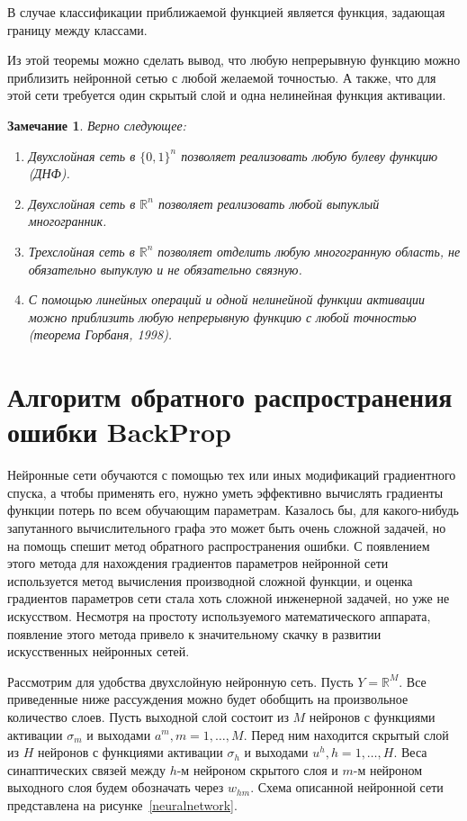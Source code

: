 \documentclass{article}
\newtheorem{remark}{Замечание}
\begin{document}
	В случае классификации приближаемой функцией является функция, задающая границу между классами.
	
	Из этой теоремы можно сделать вывод, что любую непрерывную функцию можно приблизить нейронной сетью с любой желаемой точностью. А также, что для этой сети требуется один скрытый слой и одна нелинейная функция активации. 
	
	\begin{remark}
		Верно следующее:
		\begin{enumerate} 
			\item Двухслойная сеть в $\{0,1\}^n$ позволяет реализовать любую булеву функцию (ДНФ). 
			\item Двухслойная сеть в $\mathbb{R}^n$ позволяет реализовать любой выпуклый многогранник. 
			\item Трехслойная сеть в $\mathbb{R}^n$ позволяет отделить любую многогранную область, не обязательно выпуклую и не обязательно связную. 
			\item С помощью линейных операций и одной нелинейной функции активации можно приблизить любую непрерывную функцию с любой точностью (теорема Горбаня, 1998). 
		\end{enumerate}
	\end{remark}
	
	\section{Алгоритм обратного распространения ошибки BackProp}
	Нейронные сети обучаются с помощью тех или иных модификаций градиентного спуска, а чтобы применять его, нужно уметь эффективно вычислять градиенты функции потерь по всем обучающим параметрам. Казалось бы, для какого-нибудь запутанного вычислительного графа это может быть очень сложной задачей, но на помощь спешит метод обратного распространения ошибки. С появлением этого метода для нахождения градиентов параметров нейронной сети используется метод вычисления производной сложной функции, и оценка градиентов параметров сети стала хоть сложной инженерной задачей, но уже не искусством. Несмотря на простоту используемого математического аппарата, появление этого метода привело к значительному скачку в развитии искусственных нейронных сетей.
	
	Рассмотрим для удобства двухслойную нейронную сеть. Пусть $Y = \mathbb{R}^M$. Все приведенные ниже рассуждения можно будет обобщить на произвольное количество слоев. Пусть выходной слой состоит из $M$ нейронов с функциями активации $\sigma_m$ и выходами $a^m, m = 1,\ldots,M$. Перед ним находится скрытый слой из $H$ нейронов с функциями активации $\sigma_h$ и выходами $u^h, h = 1, \ldots,H$. Веса синаптических связей между $h$-м нейроном скрытого слоя и $m$-м нейроном выходного слоя будем обозначать через $w_{hm}$. Схема описанной нейронной сети представлена на рисунке~\ref{neuralnetwork}.
	
\end{document}
